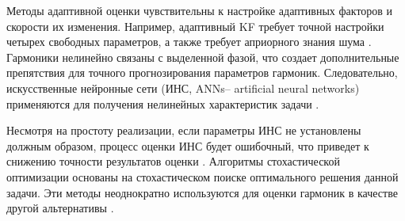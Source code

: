 
Методы адаптивной оценки чувствительны к настройке адаптивных факторов и скорости их изменения. Например, адаптивный KF требует точной настройки четырех свободных параметров, а также требует априорного знания шума \cite{ray2012ensemble}. Гармоники нелинейно связаны с выделенной фазой, что создает дополнительные препятствия для точного прогнозирования параметров гармоник.
Следовательно, искусственные нейронные сети (ИНС, ANNs-- artificial neural networks) применяются для получения нелинейных характеристик задачи \cite{6553247, 4084681, lin2016electromagnetic, joorabian2009harmonic}. 



Несмотря на простоту реализации, если параметры ИНС не установлены должным образом, процесс оценки ИНС будет ошибочный, что приведет к снижению точности результатов оценки \cite{moravej2014hybrid}. 
Алгоритмы стохастической оптимизации основаны на стохастическом поиске оптимального решения данной задачи. Эти методы неоднократно используются для оценки гармоник в качестве другой альтернативы \cite{1193852, 4469961, singh2016power}. 

